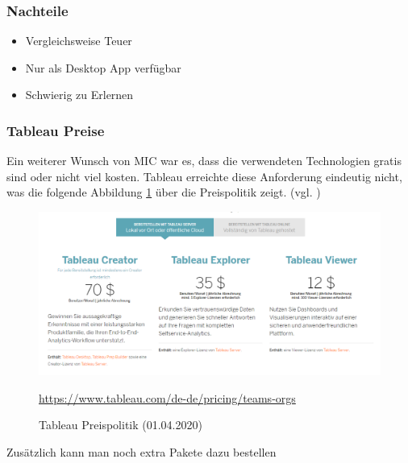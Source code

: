 \subsubsection{Nachteile}
\begin{itemize}
\item Vergleichsweise Teuer
\item Nur als Desktop App verfügbar 
\item Schwierig zu Erlernen
\end{itemize}
\subsubsection{Tableau Preise}
Ein weiterer Wunsch von MIC war es, dass die verwendeten Technologien gratis sind oder nicht viel kosten. Tableau erreichte diese Anforderung eindeutig nicht, was die folgende Abbildung \ref{img:tableu_preise} über die Preispolitik zeigt. (vgl. \cite{noauthor_tableau_2019})
\begin{figure}[H]
    \centering
    \includegraphics[scale=.45]{images/Tableau_Preise.png}
    \caption{Tableau Preispolitik (01.04.2020)}
    \url{https://www.tableau.com/de-de/pricing/teams-orgs}
    \label{img:tableu_preise}
\end{figure}
Zusätzlich kann man noch extra Pakete dazu bestellen
